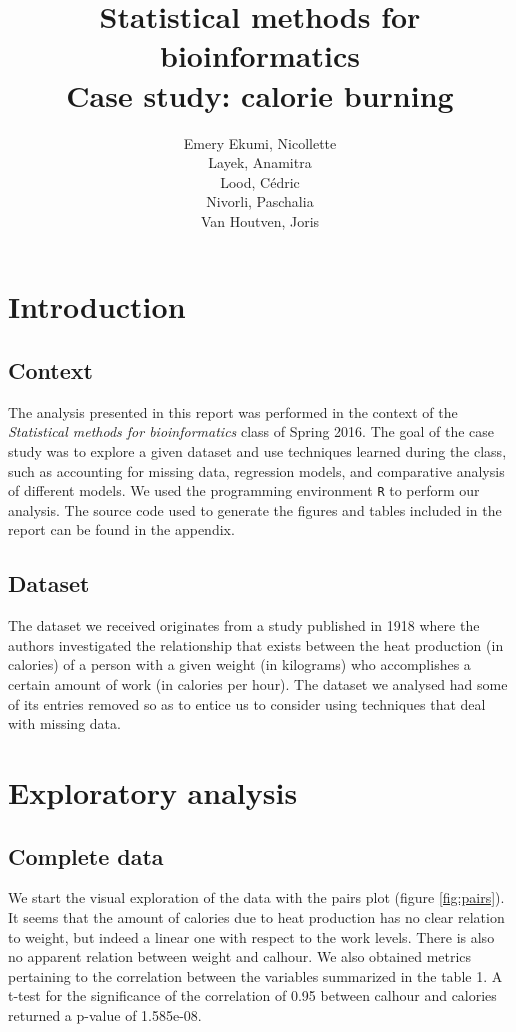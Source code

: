\documentclass[11pt, a4paper]{article}
\title{ Statistical methods for bioinformatics \\ \textbf{ Case study: calorie burning }}
\author{
        Emery Ekumi, Nicollette \\
        Layek, Anamitra \\
        Lood, Cédric \\ 
        Nivorli, Paschalia \\
        Van Houtven, Joris
}
\begin{document}
\maketitle

\section{Introduction}
\subsection{Context}
The analysis presented in this report was performed in the context of
the \emph{Statistical methods for bioinformatics} class of Spring
2016. The goal of the case study was to explore a given dataset and
use techniques learned during the class, such as accounting for
missing data, regression models, and comparative analysis of different
models. We used the programming environment \texttt{R} to perform our
analysis. The source code used to generate the figures and tables
included in the report can be found in the appendix.

\subsection{Dataset}
The dataset we received originates from a study published in 1918
\cite{greenwood1918efficiency} where the authors investigated the
relationship that exists between the heat production (in calories) of
a person with a given weight (in kilograms) who accomplishes a certain
amount of work (in calories per hour). The dataset we analysed had
some of its entries removed so as to entice us to consider using
techniques that deal with missing data.

\section{Exploratory analysis}
\subsection{Complete data}
We start the visual exploration of the data with the pairs plot
(figure \ref{fig:pairs}). It seems that the amount of calories due to
heat production has no clear relation to weight, but indeed a linear
one with respect to the work levels. There is also no apparent
relation between weight and calhour. We also obtained metrics
pertaining to the correlation between the variables summarized in the
table 1. A t-test for the significance of the correlation of 0.95
between calhour and calories returned a p-value of 1.585e-08.
\end{document}
